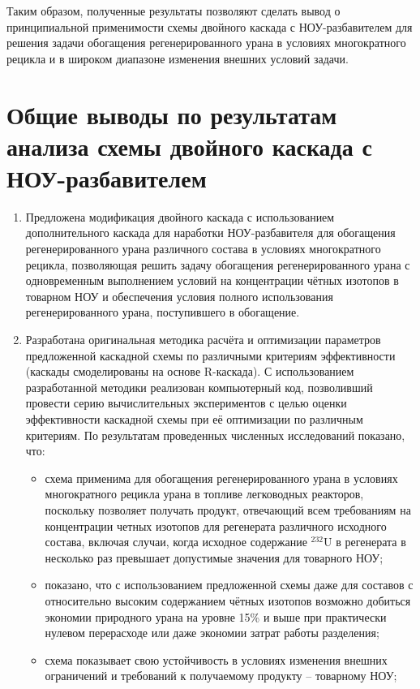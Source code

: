 {Таким образом, полученные результаты позволяют сделать вывод о принципиальной применимости схемы двойного каскада с НОУ-разбавителем для решения задачи обогащения регенерированного урана в условиях многократного рецикла и в широком диапазоне изменения внешних условий задачи.    


\section{Общие выводы по результатам анализа схемы двойного каскада с НОУ-разбавителем}

\begin{enumerate}
    \item Предложена модификация двойного каскада с использованием дополнительного каскада для наработки НОУ-разбавителя для обогащения регенерированного урана различного состава в условиях многократного рецикла, позволяющая решить задачу обогащения регенерированного урана с одновременным выполнением условий на концентрации чётных изотопов в товарном НОУ и обеспечения условия полного использования регенерированного урана, поступившего в обогащение.
    \item Разработана оригинальная методика расчёта и оптимизации параметров предложенной каскадной схемы по различными критериям эффективности (каскады смоделированы на основе R-каскада). С использованием разработанной методики реализован компьютерный код, позволивший провести серию вычислительных экспериментов с целью оценки эффективности каскадной схемы при её оптимизации по различным критериям. По результатам проведенных численных исследований показано, что:
    \begin{itemize}
    \item схема применима для обогащения регенерированного урана в условиях многократного рецикла урана в топливе легководных реакторов, поскольку позволяет получать продукт, отвечающий всем требованиям на концентрации четных изотопов для регенерата различного исходного состава, включая случаи, когда исходное содержание $^{232}$U в регенерата в несколько раз превышает допустимые значения для товарного НОУ;
    \item показано, что с использованием предложенной схемы даже для составов с относительно высоким содержанием чётных изотопов возможно добиться экономии природного урана на уровне 15\% и выше при практически нулевом перерасходе или даже экономии затрат работы разделения;
    \item схема показывает свою устойчивость в условиях изменения внешних ограничений и требований к получаемому продукту -- товарному НОУ;

\end{itemize}
\end{enumerate}}
